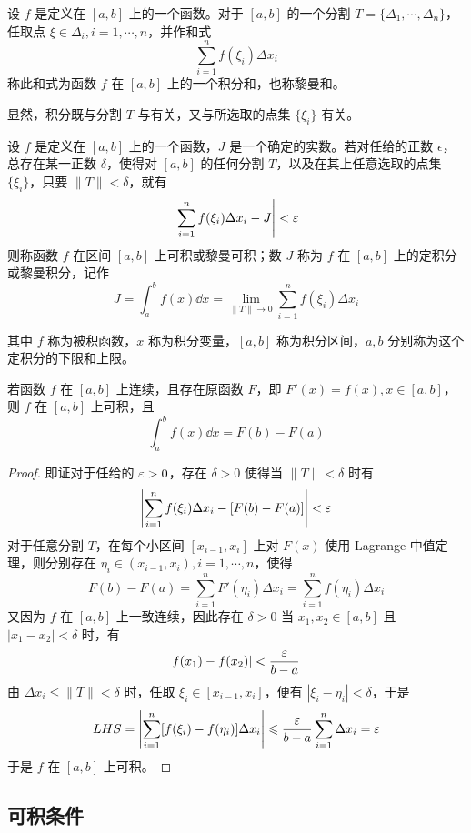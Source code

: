 \begin{definition}
    设 $f$ 是定义在 $[a,b]$ 上的一个函数。对于 $[a,b]$ 的一个分割 $T=\{\Delta_1,\cdots,\Delta_n\}$，任取点 $\xi\in\Delta_i,i=1,\cdots,n$，并作和式
    $$\sum_{i=1}^nf(\xi_i)\Delta x_i$$
    称此和式为函数 $f$ 在 $[a,b]$ 上的一个积分和，也称黎曼和。
\end{definition}

显然，积分既与分割 $T$ 与有关，又与所选取的点集 $\{\xi_i\}$ 有关。

\begin{definition}
    设 $f$ 是定义在 $[a,b]$ 上的一个函数，$J$ 是一个确定的实数。若对任给的正数 $\epsilon$，总存在某一正数 $\delta$，使得对 $[a,b]$ 的任何分割 $T$，以及在其上任意选取的点集 $\{\xi_i\}$，只要 $\| T \| < \delta$，就有
    $$\left| \sum_{i=1}^nf(\xi_i)\Delta x_i - J \right| < \varepsilon$$
    则称函数 $f$ 在区间 $[a,b]$ 上可积或黎曼可积；数 $J$ 称为 $f$ 在 $[a,b]$ 上的定积分或黎曼积分，记作
    $$J = \int_a^b f(x) \dd x = \lim_{\| T \| \to 0} \sum_{i=1}^nf(\xi_i)\Delta x_i$$
\end{definition}

其中 $f$ 称为被积函数，$x$ 称为积分变量，$[a,b]$ 称为积分区间，$a,b$ 分别称为这个定积分的下限和上限。

\begin{theorem}
    若函数 $f$ 在 $[a,b]$ 上连续，且存在原函数 $F$，即 $F'(x) = f(x), x\in[a,b]$，则 $f$ 在 $[a,b]$ 上可积，且
    $$\int_a^bf(x)\dd x = F(b) - F(a)$$
\end{theorem}

\begin{proof}
    即证对于任给的 $\varepsilon > 0$，存在 $\delta>0$ 使得当 $\| T \| < \delta$ 时有
    $$\left| \sum_{i=1}^nf(\xi_i)\Delta x_i - [F(b)-F(a)] \right| < \varepsilon$$
    对于任意分割 $T$，在每个小区间 $[x_{i-1},x_i]$ 上对 $F(x)$ 使用 Lagrange 中值定理，则分别存在 $\eta_i \in (x_{i-1},x_i),i=1,\cdots,n$，使得
    $$F(b)-F(a) = \sum_{i=1}^n F'(\eta_i)\Delta x_i = \sum_{i=1}^nf(\eta_i)\Delta x_i$$
    又因为 $f$ 在 $[a,b]$ 上一致连续，因此存在 $\delta > 0$ 当 $x_1,x_2\in[a,b]$ 且 $|x_1-x_2| < \delta$ 时，有
    $$f(x_1) - f(x_2)| < \frac{\varepsilon}{b-a}$$
    由 $\Delta x_i \leqslant \| T \| < \delta$ 时，任取 $\xi_i \in [x_{i-1},x_i]$，便有 $|\xi_i-\eta_i|<\delta$，于是
    $$LHS = \left| \sum_{i=1}^n [f(\xi_i)-f(\eta_i)]\Delta x_i \right| \leqslant \frac{\varepsilon}{b-a}\sum_{i=1}^n\Delta x_i = \varepsilon$$
    于是 $f$ 在 $[a,b]$ 上可积。
\end{proof}

\subsection{可积条件}

